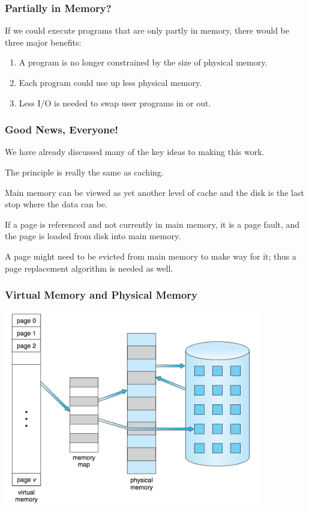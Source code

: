 \begin{frame}
\frametitle{Partially in Memory?}

If we could execute programs that are only partly in memory, there would be three major benefits:

\begin{enumerate}
	\item A program is no longer constrained by the size of physical memory.
	\item Each program could use up less physical memory.
	\item Less I/O is needed to swap user programs in or out.
\end{enumerate}

\end{frame}

\begin{frame}
\frametitle{Good News, Everyone!}

We have already discussed many of the key ideas to making this work. 

The principle is really the same as caching. 

Main memory can be viewed as yet another level of cache and the disk is the last stop where the data can be. 

If a page is referenced and not currently in main memory, it is a page fault, and the page is loaded from disk into main memory. 

A page might need to be evicted from main memory to make way for it; thus a page replacement algorithm is needed as well.

\end{frame}

\begin{frame}
\frametitle{Virtual Memory and Physical Memory}

\begin{center}
\includegraphics[width=0.85\textwidth]{images/vmem-physmem.png}
\end{center}

\end{frame}

